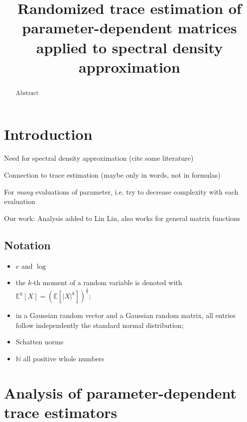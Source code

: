 \documentclass[12pt]{article}
\title{Randomized trace estimation of parameter-dependent matrices applied to spectral density approximation}
\begin{document}
\maketitle


\begin{abstract}
    Abstract
\end{abstract}

\section{Introduction}
\label{sec:introduction}


Need for spectral density approximation (cite some literature)

Connection to trace estimation (maybe only in words, not in formulas)

For \emph{many} evaluations of parameter, i.e. try to decrease complexity with each evaluation

Our work: Analysis added to Lin Lin, also works for general matrix functions

\subsection{Notation}
\begin{itemize}
    \item $e$ and $\log$
    \item the $k$-th moment of a random variable is denoted with $\mathbb{E}^{k}[X] = \left(\mathbb{E}\left[ | X |^{k} \right] \right)^{\frac{1}{k}}$;
    \item in a Gaussian random vector and a Gaussian random matrix, all entries follow independently the standard normal distribution;
    \item Schatten norms
    \item $\mathbb{N}$ all positive whole numbers
\end{itemize}

\section{Analysis of parameter-dependent trace estimators}
\label{sec:analysis}
\end{document}
